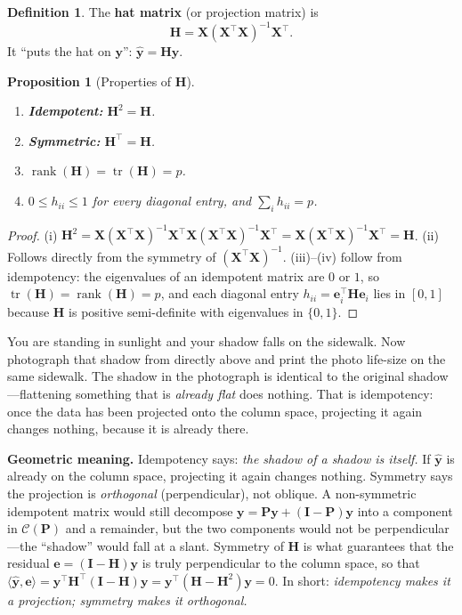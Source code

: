 \documentclass[11pt,a4paper]{article}
\theoremstyle{plain}
\newtheorem{proposition}[theorem]{Proposition}
\theoremstyle{definition}
\newtheorem{definition}[theorem]{Definition}
\newcommand{\yhat}{\hat{\bm{y}}}
\newcommand{\bX}{\bm{X}}
\newcommand{\by}{\bm{y}}
\newcommand{\be}{\bm{e}}
\newcommand{\bH}{\bm{H}}
\newcommand{\bI}{\bm{I}}
\newcommand{\Col}{\mathcal{C}}
\newcommand{\ip}[2]{\langle #1, #2 \rangle}
\DeclareMathOperator{\tr}{tr}
\DeclareMathOperator{\rank}{rank}
\begin{document}
\begin{definition}
The \textbf{hat matrix} (or projection matrix) is
\[
  \bH = \bX(\bX^\top\bX)^{-1}\bX^\top.
\]
It ``puts the hat on $\by$'': $\yhat = \bH\by$.
\end{definition}

\begin{proposition}[Properties of $\bH$]\label{prop:hat}
\leavevmode
\begin{enumerate}[nosep,label=(\roman*)]
  \item \textbf{Idempotent:} $\bH^2 = \bH$.
  \item \textbf{Symmetric:} $\bH^\top = \bH$.
  \item $\rank(\bH) = \tr(\bH) = p$.
  \item $0 \le h_{ii} \le 1$ for every diagonal entry,
        and $\sum_i h_{ii} = p$.
\end{enumerate}
\end{proposition}

\begin{proof}
(i) $\bH^2 = \bX(\bX^\top\bX)^{-1}\bX^\top
\bX(\bX^\top\bX)^{-1}\bX^\top = \bX(\bX^\top\bX)^{-1}\bX^\top = \bH$.
(ii) Follows directly from the symmetry of
$(\bX^\top\bX)^{-1}$.
(iii)--(iv) follow from idempotency: the eigenvalues of an idempotent
matrix are $0$ or $1$, so $\tr(\bH)=\rank(\bH)=p$, and each diagonal
entry $h_{ii}=\bm{e}_i^\top\bH\bm{e}_i$ lies in $[0,1]$ because $\bH$ is
positive semi-definite with eigenvalues in $\{0,1\}$.
\end{proof}

\begin{toystory}
You are standing in sunlight and your shadow falls on the sidewalk.
Now photograph that shadow from directly above and print the photo
life-size on the same sidewalk.  The shadow in the photograph is
identical to the original shadow---flattening something that is
\emph{already flat} does nothing.  That is idempotency: once the data
has been projected onto the column space, projecting it again changes
nothing, because it is already there.
\end{toystory}

\noindent\textbf{Geometric meaning.}
Idempotency says: \emph{the shadow of a shadow is itself.}
If $\yhat$ is already on the column space, projecting it again
changes nothing.
Symmetry says the projection is \emph{orthogonal} (perpendicular), not
oblique.
A non-symmetric idempotent matrix would still decompose
$\by = \bm{P}\by + (\bI - \bm{P})\by$ into a component in $\Col(\bm{P})$
and a remainder, but the two components would not be perpendicular---the
``shadow'' would fall at a slant.
Symmetry of $\bH$ is what guarantees that the residual $\be = (\bI-\bH)\by$
is truly perpendicular to the column space, so that
$\ip{\yhat}{\be} = \by^\top\bH^\top(\bI-\bH)\by = \by^\top(\bH - \bH^2)\by = 0$.
In short: \emph{idempotency makes it a projection; symmetry makes it orthogonal.}
\end{document}
